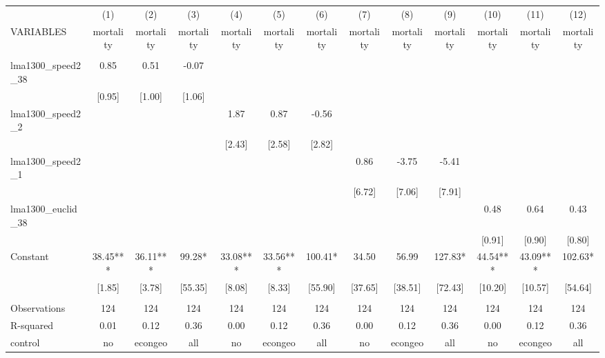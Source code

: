 \documentclass[landscape]{article}
\begin{document}
\begin{tabular}{lcccccccccccc} \hline
 & (1) & (2) & (3) & (4) & (5) & (6) & (7) & (8) & (9) & (10) & (11) & (12) \\
VARIABLES & mortality & mortality & mortality & mortality & mortality & mortality & mortality & mortality & mortality & mortality & mortality & mortality \\ \hline
 &  &  &  &  &  &  &  &  &  &  &  &  \\
lma1300\_speed2\_38 & 0.85 & 0.51 & -0.07 &  &  &  &  &  &  &  &  &  \\
 & [0.95] & [1.00] & [1.06] &  &  &  &  &  &  &  &  &  \\
lma1300\_speed2\_2 &  &  &  & 1.87 & 0.87 & -0.56 &  &  &  &  &  &  \\
 &  &  &  & [2.43] & [2.58] & [2.82] &  &  &  &  &  &  \\
lma1300\_speed2\_1 &  &  &  &  &  &  & 0.86 & -3.75 & -5.41 &  &  &  \\
 &  &  &  &  &  &  & [6.72] & [7.06] & [7.91] &  &  &  \\
lma1300\_euclid\_38 &  &  &  &  &  &  &  &  &  & 0.48 & 0.64 & 0.43 \\
 &  &  &  &  &  &  &  &  &  & [0.91] & [0.90] & [0.80] \\
Constant & 38.45*** & 36.11*** & 99.28* & 33.08*** & 33.56*** & 100.41* & 34.50 & 56.99 & 127.83* & 44.54*** & 43.09*** & 102.63* \\
 & [1.85] & [3.78] & [55.35] & [8.08] & [8.33] & [55.90] & [37.65] & [38.51] & [72.43] & [10.20] & [10.57] & [54.64] \\
 &  &  &  &  &  &  &  &  &  &  &  &  \\
Observations & 124 & 124 & 124 & 124 & 124 & 124 & 124 & 124 & 124 & 124 & 124 & 124 \\
R-squared & 0.01 & 0.12 & 0.36 & 0.00 & 0.12 & 0.36 & 0.00 & 0.12 & 0.36 & 0.00 & 0.12 & 0.36 \\
 control & no & econgeo & all & no & econgeo & all & no & econgeo & all & no & econgeo & all \\ \hline
\end{tabular}
\end{document}
